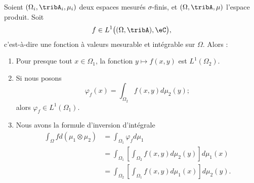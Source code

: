 \begin{theorem}\label{ThoFubinioYLtPI}
	Soient \( (\Omega_i,\tribA_i,\mu_i)\) deux espaces mesurés \( \sigma\)-finis, et \( (\Omega,\tribA,\mu)\) l'espace produit. Soit
	\begin{equation}
		f\in L^1\big( (\Omega,\tribA),\eC \big),
	\end{equation}
	c'est-à-dire une fonction à valeurs mesurable et intégrable sur \( \Omega\). Alors :
	\begin{enumerate}
		\item       \label{ITEMooVFGWooZTePQS}
		      Pour presque tout \( x\in \Omega_1\), la fonction \( y\mapsto f(x,y)\) est \( L^1(\Omega_2)\).
		\item       \label{ITEMooCYMKooUdizni}
		      Si nous posons
		      \begin{equation}
			      \varphi_f(x)=\int_{\Omega_2}f(x,y)d\mu_2(y);
		      \end{equation}
		      alors \( \varphi_f\in L^1(\Omega_1)\).
		\item   \label{ItemQMWiolgiii}
		      Nous avons la formule d'inversion d'intégrale
		      \begin{subequations}
			      \begin{align}
				      \int_{\Omega}fd(\mu_1\otimes \mu_2) & =\int_{\Omega_1}\varphi_fd\mu_1                                         \\
				                                          & =\int_{\Omega_1}\left[ \int_{\Omega_2}f(x,y)d\mu_2(y) \right]d\mu_1(x)  \\
				                                          & =\int_{\Omega_2}\left[ \int_{\Omega_1}f(x,y)d\mu_1(x) \right]d\mu_2(y).
			      \end{align}
		      \end{subequations}
	\end{enumerate}

\end{theorem}

